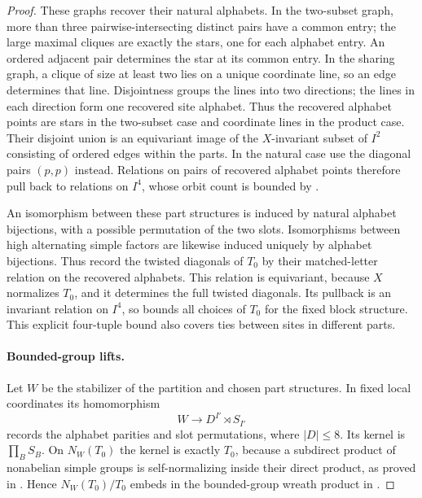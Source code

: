 \begin{proof}
These graphs recover their natural alphabets.  In the two-subset graph,
more than three pairwise-intersecting distinct pairs have a common entry;
the large maximal cliques are exactly the stars, one for each alphabet
entry.  An ordered adjacent pair determines the star at its common entry.
In the sharing graph, a clique of size at least two lies on a unique
coordinate line, so an edge determines that line.  Disjointness groups
the lines into two directions; the lines in each direction form one
recovered site alphabet.  Thus the recovered alphabet points are stars
in the two-subset case and coordinate lines in the product case.
Their disjoint union is an equivariant image of the $X$-invariant subset
of $I^2$ consisting of ordered edges within the parts.  In the natural
case use the diagonal pairs $(p,p)$ instead.  Relations on pairs of
recovered alphabet points therefore pull back to relations on $I^4$,
whose orbit count is bounded by .

An isomorphism between these part structures is induced
by natural alphabet bijections, with a possible
permutation of the two slots.  Isomorphisms between high
alternating simple factors are likewise induced uniquely
by alphabet bijections.  Thus record the twisted
diagonals of $T_0$ by their matched-letter relation on
the recovered alphabets.  This relation is equivariant,
because $X$ normalizes $T_0$, and it determines the full
twisted diagonals.  Its pullback is an invariant relation
on $I^4$, so  bounds all choices of
$T_0$ for the fixed block structure.  This explicit
four-tuple bound also covers ties between sites in
different parts.

\paragraph{Bounded-group lifts.}
Let $W$ be the stabilizer of the partition and chosen
part structures.  In fixed local coordinates its
homomorphism
\begin{equation}\label{n:normalizer-wreath}
 W\longrightarrow D^{I'}\rtimes S_{I'}
\end{equation}
records the alphabet parities and slot permutations,
where $|D|\le8$.  Its kernel is $\prod_B S_B$.
On $N_W(T_0)$ the kernel is exactly $T_0$, because a
subdirect product of nonabelian simple groups is
self-normalizing inside their direct product, as
proved in .  Hence $N_W(T_0)/T_0$
embeds in the bounded-group wreath product in
.


\end{proof}
